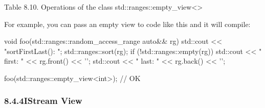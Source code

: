 \begin{center}
Table 8.10. Operations of the class std::ranges::empty\_view<>
\end{center}

For example, you can pass an empty view to code like this and it will compile:

\begin{cpp}
void foo(std::ranges::random_access_range auto&& rg)
{
	std::cout << "sortFirstLast(): \n";
	std::ranges::sort(rg);
	if (!std::ranges::empty(rg)) {
		std::cout << " first: " << rg.front() << '\n';
		std::cout << " last: " << rg.back() << '\n';
	}
}

foo(std::ranges::empty_view<int>{}); // OK
\end{cpp}

\subsubsection*{ 8.4.4\hspace{0.2cm}IStream View}

